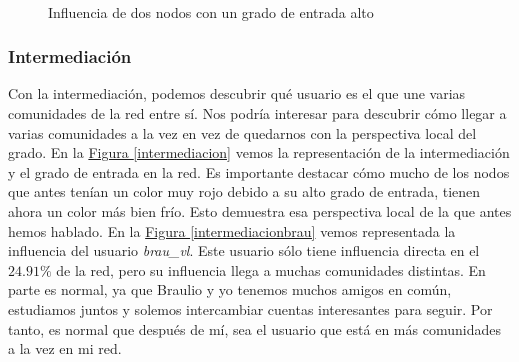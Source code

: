 \documentclass[10pt,a4paper,spanish]{article}
\numberwithin{equation}{section} %
\numberwithin{figure}{section} %
\numberwithin{table}{section} %
\begin{document}
\begin{figure}[!h]
    \centering
    \mbox{
    }
    \caption{Influencia de dos nodos con un grado de entrada alto}
    \label{infllocal}
\end{figure}

\subsubsection{Intermediación}
Con la intermediación, podemos descubrir qué usuario es el que une varias comunidades de la red entre sí. Nos podría interesar para descubrir cómo llegar a varias comunidades a la vez en vez de quedarnos con la perspectiva local del grado. En la \hyperref[intermediacion]{Figura \ref*{intermediacion}} vemos la representación de la intermediación y el grado de entrada en la red. Es importante destacar cómo mucho de los nodos que antes tenían un color muy rojo debido a su alto grado de entrada, tienen ahora un color más bien frío. Esto demuestra esa perspectiva local de la que antes hemos hablado. En la \hyperref[intermediacionbrau]{Figura \ref*{intermediacionbrau}} vemos representada la influencia del usuario \textit{brau\_vl}. Este usuario sólo tiene influencia directa en el $24.91\%$ de la red, pero su influencia llega a muchas comunidades distintas. En parte es normal, ya que Braulio y yo tenemos muchos amigos en común, estudiamos juntos y solemos intercambiar cuentas interesantes para seguir. Por tanto, es normal que después de mí, sea el usuario que está en más comunidades a la vez en mi red.
\end{document}
